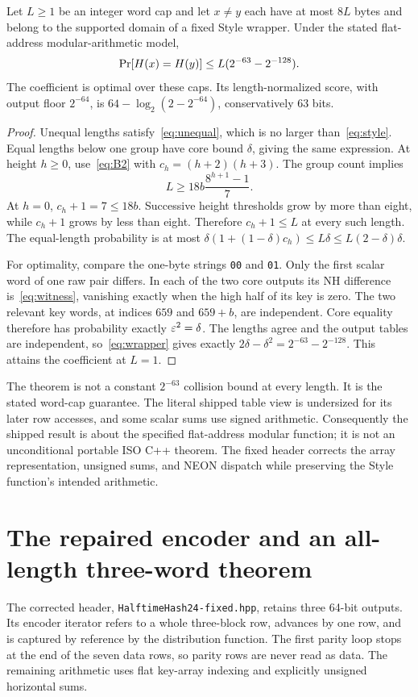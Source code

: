 \begin{theorem}\label{thm:style}
Let $L\ge1$ be an integer word cap and let $x\ne y$ each have at most $8L$ bytes and belong to the supported domain of a fixed Style wrapper. Under the stated flat-address modular-arithmetic model,
\begin{equation}\label{eq:style}
 \mathop{\rm Pr}[H(x)=H(y)]\le L(2^{-63}-2^{-128}).
\end{equation}
The coefficient is optimal over these caps. Its length-normalized score, with output floor $2^{-64}$, is $64-\log_2(2-2^{-64})$, conservatively 63 bits.
\end{theorem}
\begin{proof}
Unequal lengths satisfy~\eqref{eq:unequal}, which is no larger than~\eqref{eq:style}. Equal lengths below one group have core bound $\delta$, giving the same expression. At height $h\ge0$, use~\eqref{eq:B2} with $c_h=(h+2)(h+3)$. The group count implies
\[
 L\ge18b\frac{8^{h+1}-1}{7}.
\]
At $h=0$, $c_h+1=7\le18b$. Successive height thresholds grow by more than eight, while $c_h+1$ grows by less than eight. Therefore $c_h+1\le L$ at every such length. The equal-length probability is at most $\delta(1+(1-\delta)c_h)\le L\delta\le L(2-\delta)\delta$.

For optimality, compare the one-byte strings \texttt{00} and \texttt{01}. Only the first scalar word of one raw pair differs. In each of the two core outputs its NH difference is~\eqref{eq:witness}, vanishing exactly when the high half of its key is zero. The two relevant key words, at indices $659$ and $659+b$, are independent. Core equality therefore has probability exactly $\varepsilon^2=\delta$. The lengths agree and the output tables are independent, so~\eqref{eq:wrapper} gives exactly $2\delta-\delta^2=2^{-63}-2^{-128}$. This attains the coefficient at $L=1$.
\end{proof}
The theorem is not a constant $2^{-63}$ collision bound at every length. It is the stated word-cap guarantee. The literal shipped table view is undersized for its later row accesses, and some scalar sums use signed arithmetic. Consequently the shipped result is about the specified flat-address modular function; it is not an unconditional portable ISO C++ theorem. The fixed header corrects the array representation, unsigned sums, and NEON dispatch while preserving the Style function's intended arithmetic\cite{fixed}.

\section{The repaired encoder and an all-length three-word theorem}\label{sec:fixed}
The corrected header, \texttt{HalftimeHash24-fixed.hpp}, retains three 64-bit outputs. Its encoder iterator refers to a whole three-block row, advances by one row, and is captured by reference by the distribution function. The first parity loop stops at the end of the seven data rows, so parity rows are never read as data. The remaining arithmetic uses flat key-array indexing and explicitly unsigned horizontal sums\cite{fixed}.

